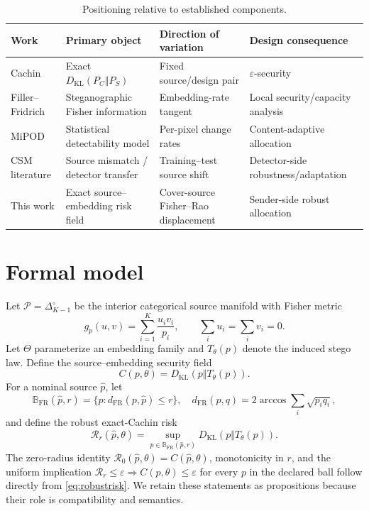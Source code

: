 \documentclass[10pt]{article}
\newcommand{\KL}{D_{\mathrm{KL}}}
\newcommand{\RR}{\mathcal{R}}
\newcommand{\FR}{\mathrm{FR}}
\begin{document}
\begin{table}[t]
\centering
\caption{Positioning relative to established components.}
\label{tab:positioning}
\small
\begin{tabularx}{\linewidth}{@{}lXXX@{}}
\toprule
Work & Primary object & Direction of variation & Design consequence\\
\midrule
Cachin \cite{cachin2004} & Exact \(\KL(P_C\Vert P_S)\) & Fixed source/design pair & \(\varepsilon\)-security\\
Filler--Fridrich \cite{filler2009icas,filler2009ih} & Steganographic Fisher information & Embedding-rate tangent & Local security/capacity analysis\\
MiPOD \cite{sedighi2016} & Statistical detectability model & Per-pixel change rates & Content-adaptive allocation\\
CSM literature \cite{giboulot2020,sepak2022,mallet2024} & Source mismatch / detector transfer & Training--test source shift & Detector-side robustness/adaptation\\
This work & Exact source--embedding risk field & Cover-source Fisher--Rao displacement & Sender-side robust allocation\\
\bottomrule
\end{tabularx}
\end{table}

\section{Formal model}
Let \(\mathcal P=\Delta_{K-1}^{\circ}\) be the interior categorical source manifold with Fisher metric
\begin{equation}
 g_p(u,v)=\sum_{i=1}^{K}\frac{u_i v_i}{p_i},
 \qquad \sum_i u_i=\sum_i v_i=0.
 \label{eq:fishermetric}
\end{equation}
Let \(\Theta\) parameterize an embedding family and \(T_\theta(p)\) denote the induced stego law. Define the source--embedding security field
\begin{equation}
  C(p,\theta)=\KL\!\left(p\Vert T_\theta(p)\right).
  \label{eq:field}
\end{equation}
For a nominal source \(\hat p\), let
\begin{equation}
 \mathbb B_{\FR}(\hat p,r)=
 \{p:d_{\FR}(p,\hat p)\le r\},
 \quad
 d_{\FR}(p,q)=2\arccos\sum_i\sqrt{p_iq_i},
 \label{eq:frball}
\end{equation}
and define the robust exact-Cachin risk
\begin{equation}
 \RR_r(\hat p,\theta)
 =
 \sup_{p\in\mathbb B_{\FR}(\hat p,r)}
 \KL\!\left(p\Vert T_\theta(p)\right).
 \label{eq:robustrisk}
\end{equation}
The zero-radius identity \(\RR_0(\hat p,\theta)=C(\hat p,\theta)\), monotonicity in \(r\), and the uniform implication \(\RR_r\le\varepsilon\Rightarrow C(p,\theta)\le\varepsilon\) for every \(p\) in the declared ball follow directly from \cref{eq:robustrisk}. We retain these statements as propositions because their role is compatibility and semantics.
\end{document}
